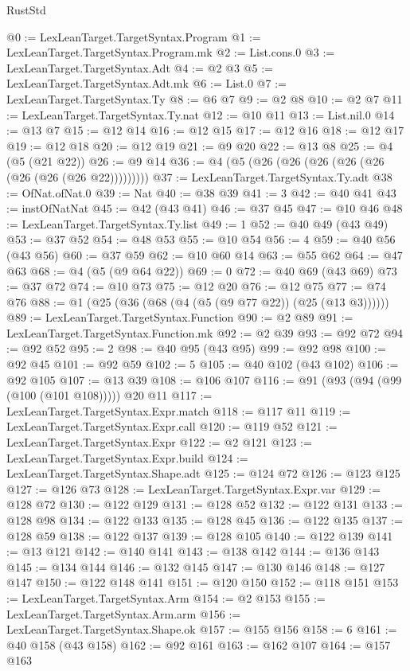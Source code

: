 \begin{lexlean}{RustStd}
\begin{coremodule}
@0 := LexLeanTarget.TargetSyntax.Program
@1 := LexLeanTarget.TargetSyntax.Program.mk
@2 := List.cons.{0}
@3 := LexLeanTarget.TargetSyntax.Adt
@4 := @2 @3
@5 := LexLeanTarget.TargetSyntax.Adt.mk
@6 := List.{0}
@7 := LexLeanTarget.TargetSyntax.Ty
@8 := @6 @7
@9 := @2 @8
@10 := @2 @7
@11 := LexLeanTarget.TargetSyntax.Ty.nat
@12 := @10 @11
@13 := List.nil.{0}
@14 := @13 @7
@15 := @12 @14
@16 := @12 @15
@17 := @12 @16
@18 := @12 @17
@19 := @12 @18
@20 := @12 @19
@21 := @9 @20
@22 := @13 @8
@25 := @4 (@5 (@21 @22))
@26 := @9 @14
@36 := @4 (@5 (@26 (@26 (@26 (@26 (@26 (@26 (@26 (@26 @22)))))))))
@37 := LexLeanTarget.TargetSyntax.Ty.adt
@38 := OfNat.ofNat.{0}
@39 := Nat
@40 := @38 @39
@41 := 3
@42 := @40 @41
@43 := instOfNatNat
@45 := @42 (@43 @41)
@46 := @37 @45
@47 := @10 @46
@48 := LexLeanTarget.TargetSyntax.Ty.list
@49 := 1
@52 := @40 @49 (@43 @49)
@53 := @37 @52
@54 := @48 @53
@55 := @10 @54
@56 := 4
@59 := @40 @56 (@43 @56)
@60 := @37 @59
@62 := @10 @60 @14
@63 := @55 @62
@64 := @47 @63
@68 := @4 (@5 (@9 @64 @22))
@69 := 0
@72 := @40 @69 (@43 @69)
@73 := @37 @72
@74 := @10 @73
@75 := @12 @20
@76 := @12 @75
@77 := @74 @76
@88 := @1 (@25 (@36 (@68 (@4 (@5 (@9 @77 @22)) (@25 (@13 @3))))))
@89 := LexLeanTarget.TargetSyntax.Function
@90 := @2 @89
@91 := LexLeanTarget.TargetSyntax.Function.mk
@92 := @2 @39
@93 := @92 @72
@94 := @92 @52
@95 := 2
@98 := @40 @95 (@43 @95)
@99 := @92 @98
@100 := @92 @45
@101 := @92 @59
@102 := 5
@105 := @40 @102 (@43 @102)
@106 := @92 @105
@107 := @13 @39
@108 := @106 @107
@116 := @91 (@93 (@94 (@99 (@100 (@101 @108))))) @20 @11
@117 := LexLeanTarget.TargetSyntax.Expr.match
@118 := @117 @11
@119 := LexLeanTarget.TargetSyntax.Expr.call
@120 := @119 @52
@121 := LexLeanTarget.TargetSyntax.Expr
@122 := @2 @121
@123 := LexLeanTarget.TargetSyntax.Expr.build
@124 := LexLeanTarget.TargetSyntax.Shape.adt
@125 := @124 @72
@126 := @123 @125
@127 := @126 @73
@128 := LexLeanTarget.TargetSyntax.Expr.var
@129 := @128 @72
@130 := @122 @129
@131 := @128 @52
@132 := @122 @131
@133 := @128 @98
@134 := @122 @133
@135 := @128 @45
@136 := @122 @135
@137 := @128 @59
@138 := @122 @137
@139 := @128 @105
@140 := @122 @139
@141 := @13 @121
@142 := @140 @141
@143 := @138 @142
@144 := @136 @143
@145 := @134 @144
@146 := @132 @145
@147 := @130 @146
@148 := @127 @147
@150 := @122 @148 @141
@151 := @120 @150
@152 := @118 @151
@153 := LexLeanTarget.TargetSyntax.Arm
@154 := @2 @153
@155 := LexLeanTarget.TargetSyntax.Arm.arm
@156 := LexLeanTarget.TargetSyntax.Shape.ok
@157 := @155 @156
@158 := 6
@161 := @40 @158 (@43 @158)
@162 := @92 @161
@163 := @162 @107
@164 := @157 @163

\end{coremodule}
\end{lexlean}
